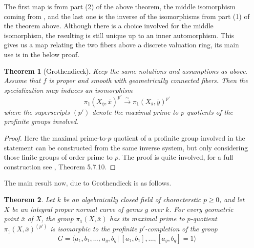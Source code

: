 \documentclass{article}
\newtheorem{theorem}{Theorem}[section]
\theoremstyle{definition}
\theoremstyle{remark}
\theoremstyle{plain}
\begin{document}
 The first map is from part (2) of the above theorem, the middle isomorphism coming from , and the last one is the inverse of the isomorphisms from part (1) of the theorem above.
Although there is a choice involved for the middle isomorphism, the resulting is still unique up to an inner automorphism.
This gives us a map relating the two fibers above a discrete valuation ring, its main use is in the below proof.

\begin{theorem}[Grothendieck] 
	Keep the same notations and assumptions as above.
	Assume that $f$ is proper and smooth with geometrically connected fibers.
	Then the specialization map induces an isomorphism 
	\[\pi_1(X_{\overline{\eta}}, \overline{x})^{p'} \xrightarrow{\sim} \pi_1(X_{\overline{s}}, \overline{y})^{p'}\]
	where the superscripts $(p')$ denote the maximal prime-to-$p$ quotients of the profinite groups involved.
	
\end{theorem}

 \begin{proof}
	 Here the maximal prime-to-$p$ quotient of a profinite group involved in the statement can be constructed from the same inverse system, but only considering those finite groups of order prime to $p$.
	 The proof is quite involved, for a full construction see \cite{Szamuely}, Theorem 5.7.10.
 \end{proof}
 
 The main result now, due to Grothendieck is as follows.
\begin{theorem}
	Let $k$ be an algebraically closed field of characterstic $p \geq 0$, and let $X$ be an integral proper normal curve of genus $g$ over $k$.
	For every geometric point $\overline{x}$ of $X$, the group $\pi_1(X, \overline{x})$ has its maximal prime to $p$-quotient $\pi_1(X, \overline{x})^{(p')}$ is isomorphic to the profinite $p'$-completion of the group
	\[G = \langle a_1, b_1, \dots, a_g, b_g \,|\, [a_1,b_1], \dots, [a_g, b_g] = 1\rangle\]
\end{theorem}
\end{document}
